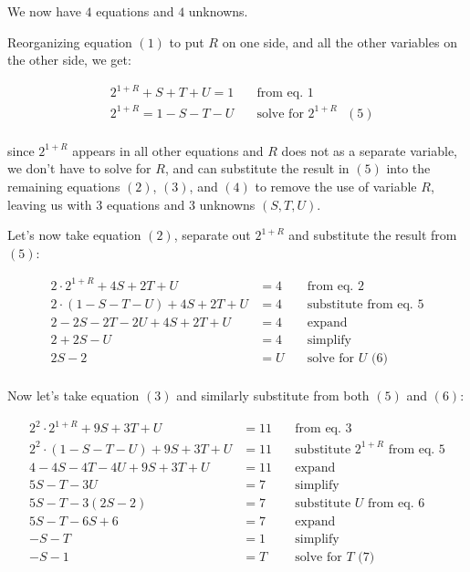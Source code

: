 We now have $4$ equations and $4$ unknowns.

Reorganizing equation $(1)$ to put $R$ on one side, and all the other
variables on the other side, we get:

$$
\begin{aligned}
& 2^{1 + R} +   S +  T + U = 1 & \quad \text{from eq. $1$} \\
& 2^{1 + R} = 1 - S - T - U    & \quad \text{solve for $2^{1+R}$ $(5)$} \\
\end{aligned}
$$

since $2^{1+R}$ appears in all other equations and $R$ does not as a separate
variable, we don't have to solve for $R$, and can substitute the result in
$(5)$ into the remaining equations $(2)$, $(3)$, and $(4)$ to remove the use of
variable $R$, leaving us with $3$ equations and $3$ unknowns $(S, T, U)$.

Let's now take equation $(2)$, separate out $2^{1+R}$ and substitute the result
from $(5)$:

$$
\begin{aligned}
2   \cdot 2^{1 + R} +  4S + 2T + U      & = 4 & \quad \text{from eq. 2} \\
2   \cdot (1 - S - T - U) + 4S + 2T + U & = 4 & \quad \text{substitute from eq. 5} \\
2 - 2S - 2T - 2U + 4S + 2T + U          & = 4 & \quad \text{expand} \\
2 + 2S - U                              & = 4 & \quad \text{simplify} \\
2S - 2                                  & = U & \quad \text{solve for $U$ (6)} \\
\end{aligned}
$$

Now let's take equation $(3)$ and similarly substitute from both $(5)$ and $(6)$:

$$
\begin{aligned}
2^2 \cdot 2^{1 + R} +  9S + 3T + U       & = 11 & \quad \text{from eq. 3} \\
2^2 \cdot (1 - S - T - U) + 9S + 3T + U  & = 11 & \quad \text{substitute $2^{1+R}$ from eq. 5} \\
4 - 4S - 4T - 4U + 9S + 3T + U           & = 11 & \quad \text{expand} \\
5S - T - 3U                              & = 7  & \quad \text{simplify} \\
5S - T - 3(2S - 2)                       & = 7  & \quad \text{substitute $U$ from eq. 6} \\
5S - T - 6S + 6                          & = 7  & \quad \text{expand} \\
-S - T                                   & = 1  & \quad \text{simplify} \\
-S - 1                                   & = T  & \quad \text{solve for $T$ (7)} \\
\end{aligned}
$$

